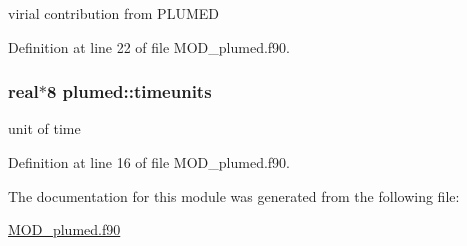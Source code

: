 virial contribution from P\-L\-U\-M\-E\-D 



Definition at line 22 of file M\-O\-D\-\_\-plumed.\-f90.

\hypertarget{classplumed_acc5066451b15cf08b371e5384f5ca7ff}{
\subsubsection[{timeunits}]{\setlength{\rightskip}{0pt plus 5cm}real$\ast$8 plumed\-::timeunits}}\label{classplumed_acc5066451b15cf08b371e5384f5ca7ff}


unit of time 



Definition at line 16 of file M\-O\-D\-\_\-plumed.\-f90.



The documentation for this module was generated from the following file\-:\begin{DoxyCompactItemize}
\item 
\hyperlink{MOD__plumed_8f90}{M\-O\-D\-\_\-plumed.\-f90}\end{DoxyCompactItemize}
